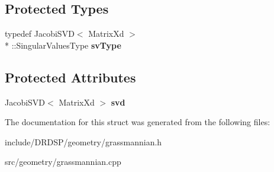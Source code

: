 \subsection*{Protected Types}
\begin{DoxyCompactItemize}
\item 
\hypertarget{struct_d_r_d_s_p_1_1_grassmannian_a23da554a1095a655265e45eed30d7327}{typedef Jacobi\-S\-V\-D$<$ Matrix\-Xd $>$\\*
\-::Singular\-Values\-Type {\bfseries sv\-Type}}\label{struct_d_r_d_s_p_1_1_grassmannian_a23da554a1095a655265e45eed30d7327}

\end{DoxyCompactItemize}
\subsection*{Protected Attributes}
\begin{DoxyCompactItemize}
\item 
\hypertarget{struct_d_r_d_s_p_1_1_grassmannian_a8086c9fce12db9b15634d9d587cd056d}{Jacobi\-S\-V\-D$<$ Matrix\-Xd $>$ {\bfseries svd}}\label{struct_d_r_d_s_p_1_1_grassmannian_a8086c9fce12db9b15634d9d587cd056d}

\end{DoxyCompactItemize}


The documentation for this struct was generated from the following files\-:\begin{DoxyCompactItemize}
\item 
include/\-D\-R\-D\-S\-P/geometry/grassmannian.\-h\item 
src/geometry/grassmannian.\-cpp\end{DoxyCompactItemize}
